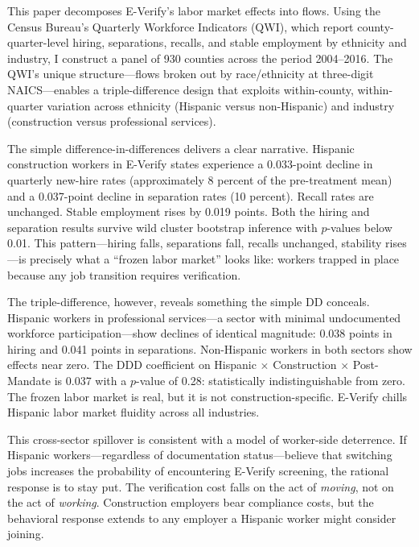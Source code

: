 \documentclass[12pt]{article}
\begin{document}
This paper decomposes E-Verify's labor market effects into flows. Using the Census Bureau's Quarterly Workforce Indicators (QWI), which report county-quarter-level hiring, separations, recalls, and stable employment by ethnicity and industry, I construct a panel of 930 counties across the period 2004--2016. The QWI's unique structure---flows broken out by race/ethnicity at three-digit NAICS---enables a triple-difference design that exploits within-county, within-quarter variation across ethnicity (Hispanic versus non-Hispanic) and industry (construction versus professional services).

The simple difference-in-differences delivers a clear narrative. Hispanic construction workers in E-Verify states experience a 0.033-point decline in quarterly new-hire rates (approximately 8 percent of the pre-treatment mean) and a 0.037-point decline in separation rates (10 percent). Recall rates are unchanged. Stable employment rises by 0.019 points. Both the hiring and separation results survive wild cluster bootstrap inference with $p$-values below 0.01. This pattern---hiring falls, separations fall, recalls unchanged, stability rises---is precisely what a ``frozen labor market'' looks like: workers trapped in place because any job transition requires verification.

The triple-difference, however, reveals something the simple DD conceals. Hispanic workers in professional services---a sector with minimal undocumented workforce participation---show declines of identical magnitude: 0.038 points in hiring and 0.041 points in separations. Non-Hispanic workers in both sectors show effects near zero. The DDD coefficient on Hispanic $\times$ Construction $\times$ Post-Mandate is 0.037 with a $p$-value of 0.28: statistically indistinguishable from zero. The frozen labor market is real, but it is not construction-specific. E-Verify chills Hispanic labor market fluidity across all industries.

This cross-sector spillover is consistent with a model of worker-side deterrence. If Hispanic workers---regardless of documentation status---believe that switching jobs increases the probability of encountering E-Verify screening, the rational response is to stay put. The verification cost falls on the act of \emph{moving}, not on the act of \emph{working}. Construction employers bear compliance costs, but the behavioral response extends to any employer a Hispanic worker might consider joining.
\end{document}
